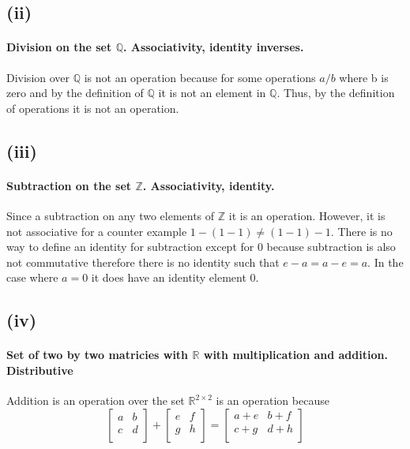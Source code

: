 \documentclass{article}
\begin{document}
    \subsection*{(ii)}
      \paragraph{Division on the set $\mathbb{Q}$. Associativity, identity inverses.}
      Division over $\mathbb{Q}$ is not an operation because for some operations $a/b$ where b is zero and by the definition of $\mathbb{Q}$ it is not an element in $\mathbb{Q}$. Thus, by the definition of operations it is not an operation.

    \subsection*{(iii)}
      \paragraph{Subtraction on the set $\mathbb{Z}$. Associativity, identity.}
      Since a subtraction on any two elements of $\mathbb{Z}$ it is an operation. However, it is not associative for a counter example $1 - (1 - 1) \neq (1-1) -1$. There is no way to define an identity for subtraction except for 0 because subtraction is also not commutative therefore there is no identity such that $e - a = a - e = a$. In the case where $a = 0$ it does have an identity element 0.

    \subsection*{(iv)}
        \paragraph{Set of two by two matricies with $\mathbb{R}$ with multiplication and addition. Distributive}
        Addition is an operation over the set $\mathbb{R}^{2 \times 2}$ is an operation because  
        \[
        \left[ {\begin{array}{cc}
            a & b \\
            c & d \\
        \end{array} } \right]
        +
        \left[ {\begin{array}{cc}
            e & f \\
            g & h \\
        \end{array} } \right]
        = 
        \left[ {\begin{array}{cc}
            a+e & b+f \\
            c+g & d+h \\
        \end{array} } \right]
        \]
\end{document}
